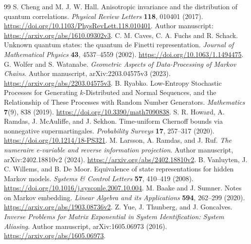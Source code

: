 \documentclass[11pt,a4paper]{article}
\begin{document}
\begin{thebibliography}{99}
S. Cheng and M. J. W. Hall.
Anisotropic invariance and the distribution of quantum correlations.
\emph{Physical Review Letters} \textbf{118}, 010401 (2017).
\url{https://doi.org/10.1103/PhysRevLett.118.010401}.
Author manuscript: \url{https://arxiv.org/abs/1610.09302v3}.
C. M. Caves, C. A. Fuchs and R. Schack.
Unknown quantum states: the quantum de Finetti representation.
\emph{Journal of Mathematical Physics} \textbf{43}, 4537--4559 (2002).
\url{https://doi.org/10.1063/1.1494475}.
G. Wolfer and S. Watanabe.
\emph{Geometric Aspects of Data-Processing of Markov Chains}.
Author manuscript, arXiv:2203.04575v3 (2023).
\url{https://arxiv.org/abs/2203.04575v3}.
B. Ryabko.
Low-Entropy Stochastic Processes for Generating \(k\)-Distributed and Normal
Sequences, and the Relationship of These Processes with Random Number Generators.
\emph{Mathematics} \textbf{7}(9), 838 (2019).
\url{https://doi.org/10.3390/math7090838}.
S. R. Howard, A. Ramdas, J. McAuliffe, and J. Sekhon.
Time-uniform Chernoff bounds via nonnegative supermartingales.
\emph{Probability Surveys} \textbf{17}, 257--317 (2020).
\url{https://doi.org/10.1214/18-PS321}.
M. Larsson, A. Ramdas, and J. Ruf.
\emph{The numeraire e-variable and reverse information projection}.
Author manuscript, arXiv:2402.18810v2 (2024).
\url{https://arxiv.org/abs/2402.18810v2}.
B. Vanluyten, J. C. Willems, and B. De Moor.
Equivalence of state representations for hidden Markov models.
\emph{Systems \& Control Letters} \textbf{57}, 410--419 (2008).
\url{https://doi.org/10.1016/j.sysconle.2007.10.004}.
M. Baake and J. Sumner.
Notes on Markov embedding.
\emph{Linear Algebra and its Applications} \textbf{594}, 262--299 (2020).
\url{https://arxiv.org/abs/1903.08736v2}.
Z. Yue, J. Thunberg, and J. Goncalves.
\emph{Inverse Problems for Matrix Exponential in System Identification:
System Aliasing}.
Author manuscript, arXiv:1605.06973 (2016).
\url{https://arxiv.org/abs/1605.06973}.
\end{thebibliography}
\end{document}
